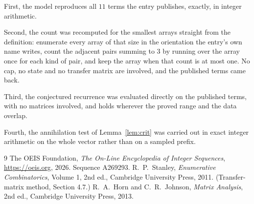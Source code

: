 \documentclass[11pt,a4paper]{article}
\theoremstyle{plain}
\theoremstyle{definition}
\begin{document}
First, the model reproduces all $11$ terms the entry publishes, exactly, in integer
arithmetic.

Second, the count was recomputed for the smallest arrays straight from the definition:
enumerate every array of that size in the orientation the entry's own name writes, count the
adjacent pairs summing to $3$ by running over the array once for each kind of pair, and keep
the array when that count is at most one. No cap, no state and no transfer matrix are involved, and
the published terms came back.

Third, the conjectured recurrence was evaluated directly on the published terms, with no
matrices involved, and holds wherever the proved range and the data overlap.

Fourth, the annihilation test of Lemma~\ref{lem:crit} was carried out in exact integer
arithmetic on the whole vector rather than on a sampled prefix.

\begin{thebibliography}{9}
 The OEIS Foundation, \emph{The On-Line Encyclopedia of Integer
Sequences}, \url{https://oeis.org}, 2026. Sequence A269293.
 R.~P.~Stanley, \emph{Enumerative Combinatorics}, Volume 1, 2nd ed.,
Cambridge University Press, 2011. (Transfer-matrix method, Section 4.7.)
 R.~A.~Horn and C.~R.~Johnson, \emph{Matrix Analysis}, 2nd ed., Cambridge
University Press, 2013.
\end{thebibliography}
\end{document}
